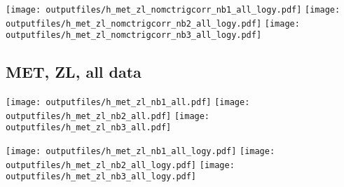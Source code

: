 \documentclass[11pt]{article}
\begin{document}
    \noindent
     \texttt{[image: outputfiles/h\_met\_zl\_nomctrigcorr\_nb1\_all\_logy.pdf]}
     \texttt{[image: outputfiles/h\_met\_zl\_nomctrigcorr\_nb2\_all\_logy.pdf]}
     \texttt{[image: outputfiles/h\_met\_zl\_nomctrigcorr\_nb3\_all\_logy.pdf]}


     \subsection{ MET, ZL, all data}

    \noindent
     \texttt{[image: outputfiles/h\_met\_zl\_nb1\_all.pdf]}
     \texttt{[image: outputfiles/h\_met\_zl\_nb2\_all.pdf]}
     \texttt{[image: outputfiles/h\_met\_zl\_nb3\_all.pdf]}

    \noindent
     \texttt{[image: outputfiles/h\_met\_zl\_nb1\_all\_logy.pdf]}
     \texttt{[image: outputfiles/h\_met\_zl\_nb2\_all\_logy.pdf]}
     \texttt{[image: outputfiles/h\_met\_zl\_nb3\_all\_logy.pdf]}









\end{document}
